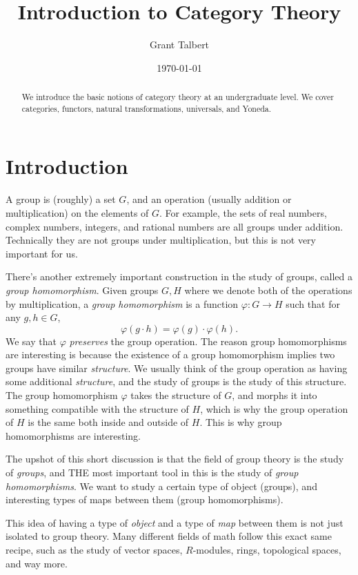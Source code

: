 \documentclass[11pt, A4]{article}
\title{Introduction to Category Theory}
\author{Grant Talbert}
\date{\today}
\begin{document}
\maketitle

\begin{abstract}
	We introduce the basic notions of category theory at an undergraduate level. We cover categories, functors, natural transformations, universals, and Yoneda.
\end{abstract}

\tableofcontents
\newpage

\section{Introduction}\label{sec1}

A group is (roughly) a set $G$, and an operation (usually addition or multiplication) on the elements of $G$. For example, the sets of real numbers, complex numbers, integers, and rational numbers are all groups under addition. Technically they are not groups under multiplication, but this is not very important for us.

There's another extremely important construction in the study of groups, called a \emph{group homomorphism}. Given groups $G,H$ where we denote both of the operations by multiplication, a \emph{group homomorphism} is a function $\varphi : G \to H$ such that for any $g,h\in G$,
\[
	\varphi (g\cdot h)=\varphi (g)\cdot \varphi (h)
.\]
We say that $\varphi $ \emph{preserves} the group operation. The reason group homomorphisms are interesting is because the existence of a group homomorphism implies two groups have similar \emph{structure}. We usually think of the group operation as having some additional \emph{structure}, and the study of groups is the study of this structure. The group homomorphism $\varphi $ takes the structure of $G$, and morphs it into something compatible with the structure of $H$, which is why the group operation of $H$ is the same both inside and outside of $H$. This is why group homomorphisms are interesting.

The upshot of this short discussion is that the field of group theory is the study of \emph{groups}, and THE most important tool in this is the study of \emph{group homomorphisms}. We want to study a certain type of object (groups), and interesting types of maps between them (group homomorphisms).

This idea of having a type of \emph{object} and a type of \emph{map} between them is not just isolated to group theory. Many different fields of math follow this exact same recipe, such as the study of vector spaces, $R$-modules, rings, topological spaces, and way more.
\end{document}
